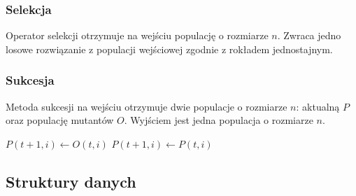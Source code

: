 \documentclass[12pt, a4paper]{article}
\begin{document}
\subsubsection{Selekcja}

Operator selekcji otrzymuje na wejściu populację o rozmiarze $n$. Zwraca jedno losowe rozwiązanie z populacji wejściowej
zgodnie z rokładem jednostajnym.

\subsubsection{Sukcesja}

Metoda sukcesji na wejściu otrzymuje dwie populacje o rozmiarze $n$: aktualną $P$ oraz populację mutantów $O$.
Wyjściem jest jedna populacja o rozmiarze $n$.

\begin{algorithm}[!htb]
\begin{algorithmic}[1]
      \State $P(t+1, i) \gets O(t, i)$
    \Else
      \State $P(t+1, i) \gets P(t, i)$
    \EndIf
  \EndFor
\EndFunction
\end{algorithmic}
\end{algorithm}

\subsection{Struktury danych}
\end{document}
